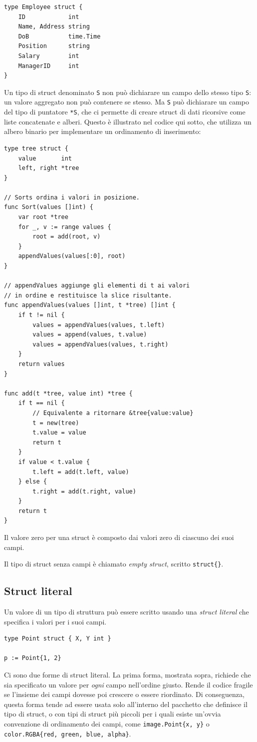 \begin{lstlisting}[frame=single, label={lst:lstlisting3-4.6}]
type Employee struct {
    ID            int
    Name, Address string
    DoB           time.Time
    Position      string
    Salary        int
    ManagerID     int
}
\end{lstlisting}
Un tipo di struct denominato \verb|S| non può dichiarare un campo dello stesso tipo \verb|S|: un valore aggregato non può contenere se stesso.
Ma \verb|S| può dichiarare un campo del tipo di puntatore \verb|*S|, che ci permette di creare struct di dati ricorsive come liste concatenate e alberi.
Questo è illustrato nel codice qui sotto, che utilizza un albero binario per implementare un ordinamento di inserimento:
\begin{lstlisting}[frame=single, label={lst:lstlisting3-4.7}]
type tree struct {
    value       int
    left, right *tree
}

// Sorts ordina i valori in posizione.
func Sort(values []int) {
    var root *tree
    for _, v := range values {
        root = add(root, v)
    }
    appendValues(values[:0], root)
}

// appendValues aggiunge gli elementi di t ai valori
// in ordine e restituisce la slice risultante.
func appendValues(values []int, t *tree) []int {
    if t != nil {
        values = appendValues(values, t.left)
        values = append(values, t.value)
        values = appendValues(values, t.right)
    }
    return values
}

func add(t *tree, value int) *tree {
    if t == nil {
        // Equivalente a ritornare &tree{value:value}
        t = new(tree)
        t.value = value
        return t
    }
    if value < t.value {
        t.left = add(t.left, value)
    } else {
        t.right = add(t.right, value)
    }
    return t
}
\end{lstlisting}
Il valore zero per una struct è composto dai valori zero di ciascuno dei suoi campi.

Il tipo di struct senza campi è chiamato \textit{empty struct}, scritto \verb|struct{}|.

\subsection{Struct literal}
\label{subsec:struct_literal}%
Un valore di un tipo di struttura può essere scritto usando una \textit{struct literal} che specifica i valori per i suoi campi.
\begin{lstlisting}[frame=single, label={lst:lstlisting3-4-1.1}]
type Point struct { X, Y int }

p := Point{1, 2}
\end{lstlisting}
Ci sono due forme di struct literal.
La prima forma, mostrata sopra, richiede che sia specificato un valore per \textit{ogni} campo nell'ordine giusto.
Rende il codice fragile se l'insieme dei campi dovesse poi crescere o essere riordinato.
Di conseguenza, questa forma tende ad essere usata solo all'interno del pacchetto che definisce il tipo di struct, o con tipi di struct più piccoli per i quali esiste un'ovvia convenzione di ordinamento dei campi, come \verb|image.Point{x, y}| o \verb|color.RGBA{red, green, blue, alpha}|.


